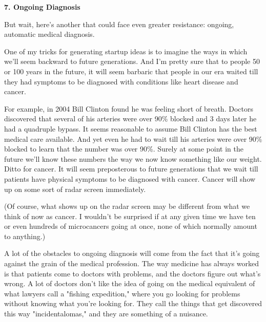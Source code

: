 \textbf{7. Ongoing Diagnosis}

But wait, here's another that could face even
                  greater resistance: ongoing, automatic medical diagnosis.

One
                  of my tricks for generating startup ideas is to imagine the
                  ways in which we'll seem backward to future generations. And
                  I'm pretty sure that to people 50 or 100 years in the future,
                  it will seem barbaric that people in our era waited till they
                  had symptoms to be diagnosed with conditions like heart
                  disease and cancer.

For example, in 2004 Bill
                  Clinton found he was feeling short of breath. Doctors
                  discovered that several of his arteries were over 90\% blocked
                  and 3 days later he had a quadruple bypass. It seems
                  reasonable to assume Bill Clinton has the best medical care
                  available. And yet even he had to wait till his arteries were
                  over 90\% blocked to learn that the number was over 90\%. Surely
                  at some point in the future we'll know these numbers the way
                  we now know something like our weight. Ditto for cancer. It
                  will seem preposterous to future generations that we wait till
                  patients have physical symptoms to be diagnosed with cancer.
                  Cancer will show up on some sort of radar screen
                  immediately.

(Of course, what shows up on the radar
                  screen may be different from what we think of now as cancer. I
                  wouldn't be surprised if at any given time we have ten or even
                  hundreds of microcancers going at once, none of which normally
                  amount to anything.)

A lot of the obstacles to
                  ongoing diagnosis will come from the fact that it's going
                  against the grain of the medical profession. The way medicine
                  has always worked is that patients come to doctors with
                  problems, and the doctors figure out what's wrong. A lot of
                  doctors don't like the idea of going on the medical equivalent
                  of what lawyers call a "fishing expedition," where you go
                  looking for problems without knowing what you're looking for.
                  They call the things that get discovered this way
                  "incidentalomas," and they are something of a nuisance.

